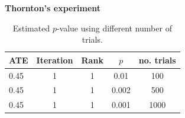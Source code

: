 \documentclass[notes=show]{beamer}
\begin{document}
\begin{frame}[plain]

\begin{center}
\textbf{Thornton's experiment}
\end{center}

\begin{table}[htbp]\small{}
\centering
\begin{tabular}{lcccc}
\toprule
ATE & Iteration & Rank & $p$ & no. trials \\
\midrule
0.45 	 & 1 & 1 & 0.01 & 100\\
0.45 	 & 1 & 1 & 0.002 & 500\\
0.45 	 & 1 & 1 & 0.001 & 1000\\
\bottomrule
\end{tabular}
\caption{Estimated $p$-value using different number of trials.}
\label{tab:starrandom}
\end{table}

\end{frame}






\end{document}
